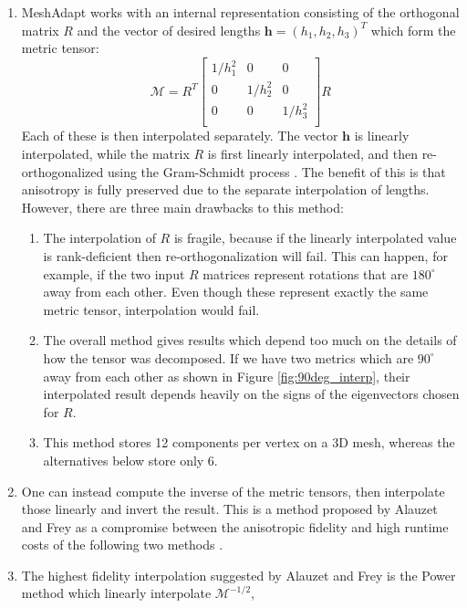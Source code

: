 \begin{enumerate}
\item MeshAdapt works with an internal representation consisting
of the orthogonal matrix $R$ and the vector of desired lengths
$\mathbf{h} = (h_1, h_2, h_3)^T$ which form the metric tensor:
\begin{equation}
\mathcal{M} = R^T \begin{bmatrix}
1 / h_1^2 & 0 & 0 \\
0 & 1 / h_2^2 & 0 \\
0 & 0 & 1 / h_3^2 \\
\end{bmatrix} R
\end{equation}
Each of these is then interpolated separately.
The vector $\mathbf{h}$ is linearly interpolated, while the
matrix $R$ is first linearly interpolated, and then re-orthogonalized
using the Gram-Schmidt process \cite{trefethen1997numerical}.
The benefit of this is that anisotropy is fully preserved due to the
separate interpolation of lengths.
However, there are three main drawbacks to this method:
\begin{enumerate}
\item The interpolation of $R$ is fragile, because if the linearly
interpolated value is rank-deficient then re-orthogonalization
will fail. This can happen, for example, if the two input $R$ matrices
represent rotations that are $180^{\circ}$ away from each other.
Even though these represent exactly the same metric tensor, interpolation
would fail.
\item The overall method gives results which depend too much on the
details of how the tensor was decomposed.
If we have two metrics which are $90^{\circ}$ away from each other
as shown in Figure \ref{fig:90deg_interp},
their interpolated result depends heavily on the signs of the eigenvectors
chosen for $R$.
\item This method stores 12 components per vertex on a 3D mesh, whereas
the alternatives below store only 6.
\end{enumerate}
\item One can instead compute the inverse of the metric tensors, then
interpolate those linearly and invert the result.
This is a method proposed by Alauzet and Frey as a compromise between
the anisotropic fidelity and high runtime costs of the following two methods
\cite{alauzet2003estimateur}.
\item The highest fidelity interpolation suggested by Alauzet and Frey is
the Power method which linearly interpolate $\mathcal{M}^{-1/2}$,

\end{enumerate}
